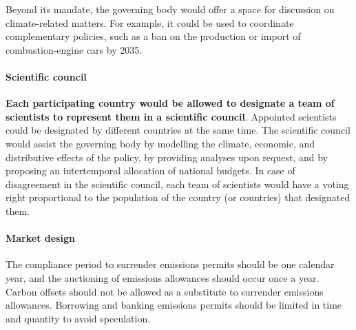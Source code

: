\documentclass[12pt,english]{article}
\begin{document}
Beyond its mandate, the governing body would offer a space for discussion on climate-related matters. For example, it could be used to coordinate complementary policies, such as a ban on the production or import of combustion-engine cars by 2035.

\paragraph{Scientific council}
\textbf{Each participating country would be allowed to designate a team of scientists to represent them in a scientific council}. Appointed scientists could be designated by different countries at the same time. The scientific council would assist the governing body by modelling the climate, economic, and distributive effects of the policy, by providing analyses upon request, and by proposing an intertemporal allocation of national budgets. In case of disagreement in the scientific council, each team of scientists would have a voting right proportional to the population %
of the country (or countries) that designated them.


\paragraph{Market design} 
The compliance period to surrender emissions permits should be one calendar year, and the auctioning of emissions allowances should occur once a year. Carbon offsets should not be allowed as a substitute to surrender emissions allowances. Borrowing and banking emissions permits should be limited in time and quantity to avoid speculation. %

\end{document}
